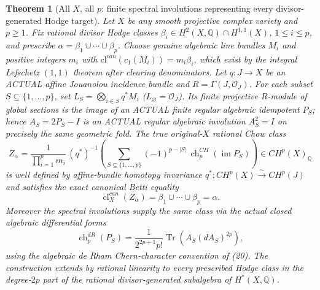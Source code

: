 \documentclass[11pt]{article}
\newtheorem{theorem}{Theorem}[section]
\begin{document}
\begin{theorem}[All $X$, all $p$: finite spectral involutions representing every divisor-generated Hodge target]
Let $X$ be any smooth projective complex variety and $p\ge1$.
Fix rational divisor Hodge classes
$\beta_i\in H^2(X,\mathbb Q)\cap H^{1,1}(X)$, $1\le i\le p$, and
prescribe $\alpha=\beta_1\cup\cdots\cup\beta_p$.
Choose genuine algebraic line bundles $M_i$ and positive integers
$m_i$ with $\mathrm{cl}^{can}(c_1(M_i))=m_i\beta_i$,
which exist by the integral Lefschetz $(1,1)$ theorem after clearing
denominators. Let $q:J\to X$ be an ACTUAL affine Jouanolou
incidence bundle and $R=\Gamma(J,\mathcal O_J)$.
For each subset $S\subseteq\{1,\ldots,p\}$, set
$L_S=\bigotimes_{i\in S}q^*M_i$ ($L_{\varnothing}=\mathcal O_J$).
Its finite projective $R$-module of global sections is the image
of an ACTUAL finite regular algebraic idempotent $P_S$; hence
$A_S=2P_S-I$ is an ACTUAL regular algebraic involution
$A_S^2=I$ on precisely the same geometric fold. The true
original-$X$ rational Chow class
\[
 \boxed{\displaystyle
 Z_\alpha=\frac{1}{\prod_{i=1}^p m_i}\,
    (q^*)^{-1}
    \left(\sum_{S\subseteq\{1,\ldots,p\}}
      (-1)^{p-|S|}\,
      \operatorname{ch}^{CH}_p(\operatorname{im}P_S)\right)
     \in CH^p(X)_{\mathbb Q}}
                                                               \tag{28}
\]
is well defined by affine-bundle homotopy invariance
$q^*:CH^p(X)\xrightarrow{\sim}CH^p(J)$
and satisfies the exact canonical Betti equality
\[
 \boxed{\operatorname{cl}^{can}_X(Z_\alpha)=
                     \beta_1\cup\cdots\cup\beta_p=\alpha.}     \tag{29}
\]
Moreover the spectral involutions supply the same class via the
\emph{actual closed algebraic differential} forms
\[
 \operatorname{ch}^{dR}_p(P_S)
  =\frac{1}{2^{2p+1}p!}
    \operatorname{Tr}(A_S(dA_S)^{2p}),                         \tag{30}
\]
using the algebraic de Rham Chern-character convention of (20).
The construction extends by rational linearity to every prescribed
Hodge class in the degree-$2p$ part of the rational divisor-generated
subalgebra of $H^*(X,\mathbb Q)$.
\end{theorem}
\end{document}
